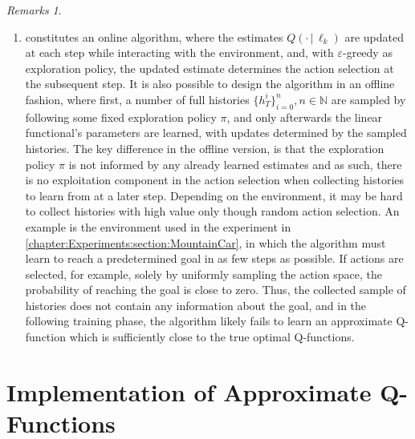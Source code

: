 \documentclass[
    a4paper,
    11pt,
    bibliography=totoc,
    listof=totoc,      
    headinclude=true,
    cleardoublepage=empty,
]{scrbook}
\theoremstyle{plain}
\theoremstyle{definition}
\theoremstyle{remark}
\newtheorem{remarks}[theorem]{Remarks}
\newcommand{\SetN}{\mathbb N}
\begin{document}
\begin{remarks}
\begin{enumerate}
        \item {} constitutes an online
        algorithm, where the estimates $Q(\cdot\,|\,\ell_k)$ are updated at each step while
        interacting with the environment, and, with $\varepsilon$-greedy as exploration policy, the updated estimate determines
        the action selection at the subsequent step. It is also possible to
        design the algorithm in an offline fashion, where first, a number of full histories $\{h_T^i\}_{i=0}^n, n\in\SetN$ are sampled by following some fixed exploration policy $\pi$, and only afterwards the linear functional's parameters are learned, with updates determined by the sampled histories. The key difference in the offline version, is that the exploration policy $\pi$ is not informed by any already learned estimates and as such, there is no exploitation component in the action selection when collecting histories to learn from at a later step. Depending on the environment, it may be hard to collect histories with high value only though random action selection. An example is the environment used in the experiment in \cref{chapter:Experiments:section:MountainCar}, in which the algorithm must learn to reach a predetermined goal in as few steps as possible. If actions are selected, for example, solely by uniformly sampling the action space, the probability of reaching the goal is close to zero. Thus, the collected sample of histories does not contain any information about the goal, and in the following training phase, the algorithm likely fails to learn an approximate Q-function which is sufficiently close to the true optimal Q-functions.
        \end{enumerate} 
\end{remarks}   

\section{Implementation of Approximate Q-Functions}
\label{chapter:SignatureQLearning:section:QImplementation}
\end{document}
